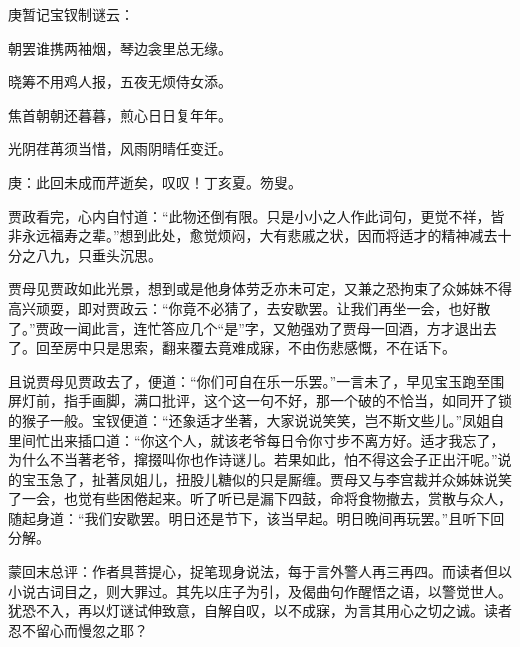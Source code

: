 \begin{poem}
    \begin{note} 庚暂记宝钗制谜云：\end{note}

    \begin{pl} 朝罢谁携两袖烟，琴边衾里总无缘。\end{pl}

    \begin{pl} 晓筹不用鸡人报，五夜无烦侍女添。\end{pl}

    \begin{pl} 焦首朝朝还暮暮，煎心日日复年年。\end{pl}

    \begin{pl} 光阴荏苒须当惜，风雨阴晴任变迁。\end{pl}
\end{poem}


\begin{parag}
    \begin{note}庚：此回未成而芹逝矣，叹叹！丁亥夏。笏叟。\end{note}
\end{parag}


\begin{parag}
    贾政看完，心内自忖道：“此物还倒有限。只是小小之人作此词句，更觉不祥，皆非永远福寿之辈。”想到此处，愈觉烦闷，大有悲戚之状，因而将适才的精神减去十分之八九，只垂头沉思。
\end{parag}


\begin{parag}
    贾母见贾政如此光景，想到或是他身体劳乏亦未可定，又兼之恐拘束了众姊妹不得高兴顽耍，即对贾政云：“你竟不必猜了，去安歇罢。让我们再坐一会，也好散了。”贾政一闻此言，连忙答应几个“是”字，又勉强劝了贾母一回酒，方才退出去了。回至房中只是思索，翻来覆去竟难成寐，不由伤悲感慨，不在话下。
\end{parag}


\begin{parag}
    且说贾母见贾政去了，便道：“你们可自在乐一乐罢。”一言未了，早见宝玉跑至围屏灯前，指手画脚，满口批评，这个这一句不好，那一个破的不恰当，如同开了锁的猴子一般。宝钗便道：“还象适才坐著，大家说说笑笑，岂不斯文些儿。”凤姐自里间忙出来插口道：“你这个人，就该老爷每日令你寸步不离方好。适才我忘了，为什么不当著老爷，撺掇叫你也作诗谜儿。若果如此，怕不得这会子正出汗呢。”说的宝玉急了，扯著凤姐儿，扭股儿糖似的只是厮缠。贾母又与李宫裁并众姊妹说笑了一会，也觉有些困倦起来。听了听已是漏下四鼓，命将食物撤去，赏散与众人，随起身道：“我们安歇罢。明日还是节下，该当早起。明日晚间再玩罢。”且听下回分解。
\end{parag}


\begin{parag}
    \begin{note}蒙回末总评：作者具菩提心，捉笔现身说法，每于言外警人再三再四。而读者但以小说古词目之，则大罪过。其先以庄子为引，及偈曲句作醒悟之语，以警觉世人。犹恐不入，再以灯谜试伸致意，自解自叹，以不成寐，为言其用心之切之诚。读者忍不留心而慢忽之耶？\end{note}
\end{parag}

